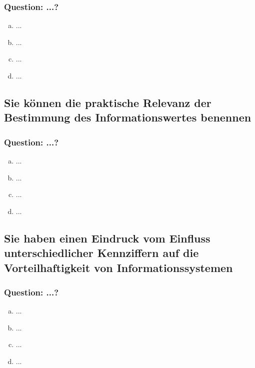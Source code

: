 \documentclass{article}
\begin{document}
\begin{adjustwidth}{2em}{2em}
\begin{adjustwidth}{2em}{2em}
\begin{adjustwidth}{1em}{}
				\subsubsection*{Question: ...?}
				\begin{adjustwidth}{1em}{}
					\begin{enumerate}[(a)]
						\item ...
						\item ...
						\item ...
						\item ...
					\end{enumerate}
				\end{adjustwidth}
			\end{adjustwidth}
			\subsection{Sie können die praktische Relevanz der Bestimmung des Informationswertes benennen}
			\begin{adjustwidth}{1em}{}
				\subsubsection*{Question: ...?}
				\begin{adjustwidth}{1em}{}
					\begin{enumerate}[(a)]
						\item ...
						\item ...
						\item ...
						\item ...
					\end{enumerate}
				\end{adjustwidth}
			\end{adjustwidth}
			\subsection{Sie haben einen Eindruck vom Einfluss unterschiedlicher Kennziffern auf die Vorteilhaftigkeit von Informationssystemen}
			\begin{adjustwidth}{1em}{}
				\subsubsection*{Question: ...?}
				\begin{adjustwidth}{1em}{}
					\begin{enumerate}[(a)]
						\item ...
						\item ...
						\item ...
						\item ...
					\end{enumerate}
				\end{adjustwidth}
			\end{adjustwidth}
		\end{adjustwidth}
	\end{adjustwidth}
	
\end{document}
